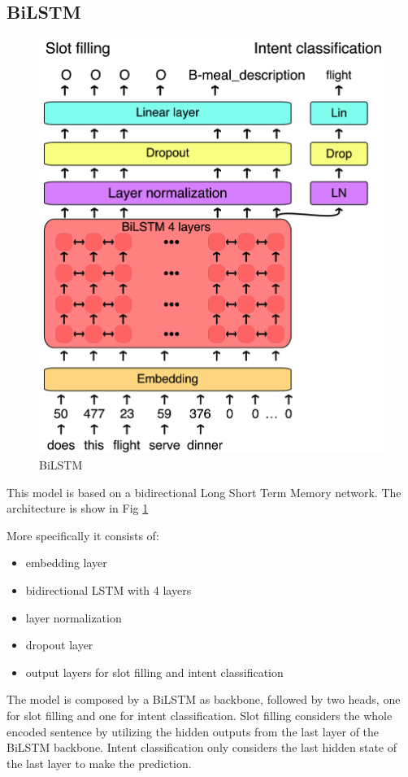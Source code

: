 \documentclass[a4paper]{article}
\begin{document}
\subsection{BiLSTM}
\begin{figure}[h!]
	\centering
	\includegraphics[width=0.8\linewidth]{../assets/BiLSTM}
	\caption{BiLSTM}
	\label{fig:bilstm}
\end{figure}

This model is based on a bidirectional Long Short Term Memory network. The architecture is show in Fig \ref{fig:bilstm}

More specifically it consists of:
\begin{itemize}
	\item embedding layer
	\item bidirectional LSTM with 4 layers
	\item layer normalization
	\item dropout layer
	\item output layers for slot filling and intent classification
\end{itemize}

The model is composed by a BiLSTM as backbone, followed by two heads, one for slot filling and one for intent classification. Slot filling considers the whole encoded sentence by utilizing the hidden outputs from the last layer of the BiLSTM backbone. Intent classification only considers the last hidden state of the last layer to make the prediction.
\end{document}
